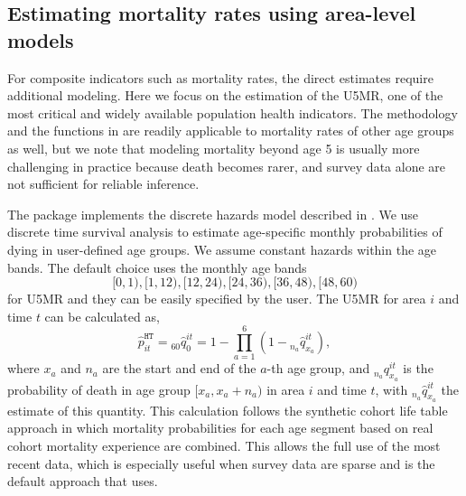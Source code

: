 \subsection{Estimating mortality rates using area-level models}\label{estimating-mortality-rates-using-area-level-models}

For composite indicators such as mortality rates, the direct estimates require additional modeling. Here we focus on the estimation of the U5MR, one of the most critical and widely available population health indicators. The methodology and the functions in  are readily applicable to mortality rates of other age groups as well, but we note that modeling mortality beyond age 5 is usually more challenging in practice because death becomes rarer, and survey data alone are not sufficient for reliable inference.

The  package implements the discrete hazards model described in \citet{mercer_etal_15}. We use discrete time survival analysis to estimate age-specific monthly probabilities of dying in user-defined age groups. We assume constant hazards within the age bands. The default choice uses the monthly age bands
\[[0, 1), [1, 12), [12, 24), [24, 36), [36, 48), [48, 60)\]
for U5MR and they can be easily specified by the user. The U5MR for area \(i\) and time \(t\) can be calculated as,
\begin{equation}
\hat p_{it}^{\texttt{HT}} = {}_{60}{\hat q}^{it}_{0} = 1 - \prod_{a = 1}^6 \left( 1 -  {}_{n_a}{\hat q}^{it}_{x_a}\right),
\end{equation}
where \(x_a\) and \(n_a\) are the start and end of the \(a\)-th age group, and \({}_{n_a}{q}^{it}_{x_a}\) is the probability of death in age group \([x_a, x_a + n_a)\) in area \(i\) and time \(t\), with \({}_{n_a}{\hat q}^{it}_{x_a}\) the estimate of this quantity. This calculation follows the synthetic cohort life table approach in which mortality probabilities for each age segment based on real cohort mortality experience are combined. This allows the full use of the most recent data, which is especially useful when survey data are sparse and is the default approach that \citet{dhsspatial} uses.

